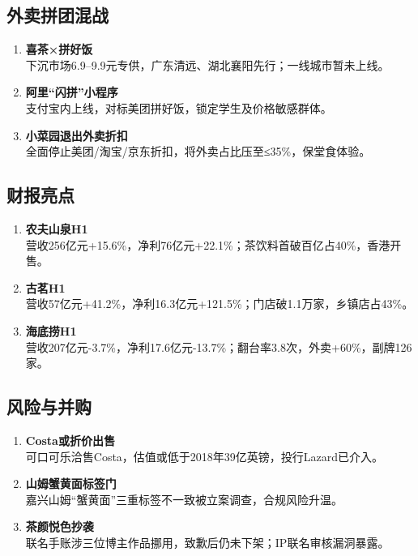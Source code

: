 \subsection{外卖拼团混战}
\begin{enumerate}[leftmargin=*, nosep]
    \item \textbf{喜茶×拼好饭}  \\
    下沉市场6.9–9.9元专供，广东清远、湖北襄阳先行；一线城市暂未上线。
    \item \textbf{阿里“闪拼”小程序}  \\
    支付宝内上线，对标美团拼好饭，锁定学生及价格敏感群体。
    \item \textbf{小菜园退出外卖折扣}  \\
    全面停止美团/淘宝/京东折扣，将外卖占比压至≤35\%，保堂食体验。
\end{enumerate}

\subsection{财报亮点}
\begin{enumerate}[leftmargin=*, nosep]
    \item \textbf{农夫山泉H1}  \\
    营收256亿元+15.6\%，净利76亿元+22.1\%；茶饮料首破百亿占40\%，香港开售。
    \item \textbf{古茗H1}  \\
    营收57亿元+41.2\%，净利16.3亿元+121.5\%；门店破1.1万家，乡镇店占43\%。
    \item \textbf{海底捞H1}  \\
    营收207亿元-3.7\%，净利17.6亿元-13.7\%；翻台率3.8次，外卖+60\%，副牌126家。
\end{enumerate}

\subsection{风险与并购}
\begin{enumerate}[leftmargin=*, nosep]
    \item \textbf{Costa或折价出售}  \\
    可口可乐洽售Costa，估值或低于2018年39亿英镑，投行Lazard已介入。
    \item \textbf{山姆蟹黄面标签门}  \\
    嘉兴山姆“蟹黄面”三重标签不一致被立案调查，合规风险升温。
    \item \textbf{茶颜悦色抄袭}  \\
    联名手账涉三位博主作品挪用，致歉后仍未下架；IP联名审核漏洞暴露。
\end{enumerate}


